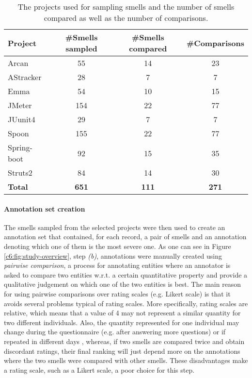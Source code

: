 \begin{table}[]
    \footnotesize
    \centering
    \caption{The projects used for sampling smells and the number of smells compared as well as the number of comparisons.}
    \label{c6:tab:smells-data-set}
    \begin{tabular}{@{}lccc@{}}
    \toprule
    \textbf{Project} & \textbf{\#Smells sampled} & \textbf{\#Smells compared} & \textbf{\#Comparisons} \\ \midrule
    Arcan & 55 & 14 & 23 \\
    AStracker & 28 & 7 & 7 \\
    Emma & 54 & 10 & 15 \\
    JMeter & 154 & 22 & 77 \\
    JUunit4 & 29 & 7 & 7 \\
    Spoon & 155 & 22 & 77 \\
    Spring-boot & 92 & 15 & 35 \\
    Struts2 & 84 & 14 & 30 \\ \midrule
    \textbf{Total} & \textbf{651} & \textbf{111} & \textbf{271} \\ \bottomrule
    \end{tabular}
\end{table}

\paragraph{Annotation set creation}
The smells sampled from the selected projects were then used to create an annotation set that contained, for each record, a pair of smells and an annotation denoting which one of them is the most severe one.
As one can see in Figure \ref{c6:fig:study-overview}, step \emph{(b)}, annotations were manually created using \emph{pairwise comparison}, a process for annotating entities \cite{David1963} where an annotator is asked to compare two entities w.r.t. a certain quantitative property and provide a qualitative judgement on which one of the two entities is best.
The main reason for using pairwise comparisons over rating scales (e.g. Likert scale) is that it avoids several problems typical of rating scales. 
More specifically, rating scales are relative, which means that a value of 4 may not represent a similar quantity for two different individuals.
Also, the quantity represented for one individual may change during the questionnaire (e.g. after answering more questions) or if repeated in different days \cite{Perezortiz2017}, whereas, if two smells are compared twice and obtain discordant ratings, their final ranking will just depend more on the annotations where the two smells were compared with other smells.
These disadvantages make a rating scale, such as a Likert scale, a poor choice for this step.

